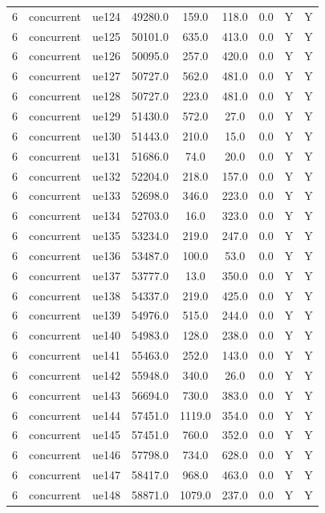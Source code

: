 \begin{table}[ht]
\begin{tabular}{|c|c|c|c|c|c|c|c|c|}
6 & concurrent & ue124 & 49280.0 & 159.0 & 118.0 & 0.0 & Y & Y \\
6 & concurrent & ue125 & 50101.0 & 635.0 & 413.0 & 0.0 & Y & Y \\
6 & concurrent & ue126 & 50095.0 & 257.0 & 420.0 & 0.0 & Y & Y \\
6 & concurrent & ue127 & 50727.0 & 562.0 & 481.0 & 0.0 & Y & Y \\
6 & concurrent & ue128 & 50727.0 & 223.0 & 481.0 & 0.0 & Y & Y \\
6 & concurrent & ue129 & 51430.0 & 572.0 & 27.0 & 0.0 & Y & Y \\
6 & concurrent & ue130 & 51443.0 & 210.0 & 15.0 & 0.0 & Y & Y \\
6 & concurrent & ue131 & 51686.0 & 74.0 & 20.0 & 0.0 & Y & Y \\
6 & concurrent & ue132 & 52204.0 & 218.0 & 157.0 & 0.0 & Y & Y \\
6 & concurrent & ue133 & 52698.0 & 346.0 & 223.0 & 0.0 & Y & Y \\
6 & concurrent & ue134 & 52703.0 & 16.0 & 323.0 & 0.0 & Y & Y \\
6 & concurrent & ue135 & 53234.0 & 219.0 & 247.0 & 0.0 & Y & Y \\
6 & concurrent & ue136 & 53487.0 & 100.0 & 53.0 & 0.0 & Y & Y \\
6 & concurrent & ue137 & 53777.0 & 13.0 & 350.0 & 0.0 & Y & Y \\
6 & concurrent & ue138 & 54337.0 & 219.0 & 425.0 & 0.0 & Y & Y \\
6 & concurrent & ue139 & 54976.0 & 515.0 & 244.0 & 0.0 & Y & Y \\
6 & concurrent & ue140 & 54983.0 & 128.0 & 238.0 & 0.0 & Y & Y \\
6 & concurrent & ue141 & 55463.0 & 252.0 & 143.0 & 0.0 & Y & Y \\
6 & concurrent & ue142 & 55948.0 & 340.0 & 26.0 & 0.0 & Y & Y \\
6 & concurrent & ue143 & 56694.0 & 730.0 & 383.0 & 0.0 & Y & Y \\
6 & concurrent & ue144 & 57451.0 & 1119.0 & 354.0 & 0.0 & Y & Y \\
6 & concurrent & ue145 & 57451.0 & 760.0 & 352.0 & 0.0 & Y & Y \\
6 & concurrent & ue146 & 57798.0 & 734.0 & 628.0 & 0.0 & Y & Y \\
6 & concurrent & ue147 & 58417.0 & 968.0 & 463.0 & 0.0 & Y & Y \\
6 & concurrent & ue148 & 58871.0 & 1079.0 & 237.0 & 0.0 & Y & Y \\

\end{tabular}
\end{table}
